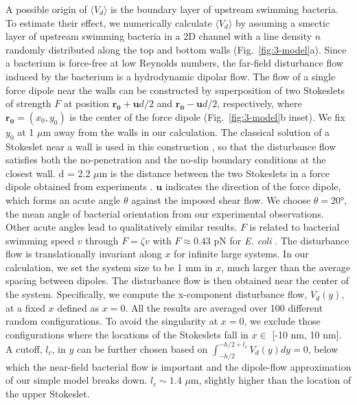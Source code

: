 A possible origin of $\langle V_d \rangle$ is the boundary layer of upstream swimming bacteria. To estimate their effect, we numerically calculate $\langle V_d \rangle$ by assuming a smectic layer of upstream swimming bacteria in a 2D channel with a line density $n$ randomly distributed along the top and bottom walls (Fig.~\ref{fig:3-model}a). Since a bacterium is force-free at low Reynolds numbers, the far-field disturbance flow induced by the bacterium is a hydrodynamic dipolar flow.
The flow of a single force dipole near the walls can be constructed by superposition of two Stokeslets of strength $F$ at position $\mathbf{r_0} + \mathbf{u}d/2$ and $\mathbf{r_0} - \mathbf{u}d/2$, respectively, where $\mathbf{r_0} = (x_0, y_0)$ is the center of the force dipole (Fig.~\ref{fig:3-model}b inset). We fix $y_0$ at 1 $\mu$m away from the walls in our calculation.
The classical solution of a Stokeslet near a wall is used in this construction \cite{Blake1971}, so that the disturbance flow satisfies both the no-penetration and the no-slip boundary conditions at the closest wall. d = 2.2 $\mu$m is the distance between
the two Stokeslets in a force dipole obtained from experiments \cite{Drescher2011}. $\mathbf{u}$ indicates the direction of the force
dipole, which forms an acute angle $\theta$ against the imposed shear flow. We choose $\theta = 20$°, the mean angle of bacterial
orientation from our experimental observations. Other acute angles lead to qualitatively similar results. $F$ is related to bacterial
swimming speed $v$ through $F = \zeta v$ with $F \approx 0.43$ pN for \textit{E. coli} \cite{Drescher2011}. The disturbance flow is translationally invariant along $x$ for infinite large systems. In our calculation, we set the system size to be 1 mm in $x$, much larger than the average spacing between dipoles. The disturbance flow is then obtained near the center of the system. Specifically, we compute the x-component disturbance flow, $V_d(y)$, at a fixed $x$ defined as $x = 0$. All the results are averaged over 100 different random configurations. To avoid the singularity at $x = 0$, we exclude those configurations where the locations of the Stokeslets fall in $x \in$ [-10 nm, 10 nm].
A cutoff, $l_c$, in $y$ can be further chosen based on $\int_{-h/2}^{-h/2+l_c} V_d(y)dy = 0$, below which the near-field bacterial flow is important and the dipole-flow approximation of our simple model breaks down.
$l_c \sim 1.4$ $\mu$m, slightly higher than the location of the upper Stokeslet.


